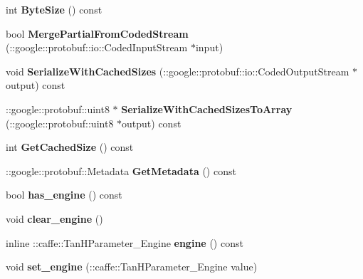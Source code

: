 \begin{DoxyCompactItemize}
int {\bfseries Byte\+Size} () const
\item 
\mbox{\label{classcaffe_1_1_tan_h_parameter_afb75bf9760a1dcd7747487f42086c86d}} 
bool {\bfseries Merge\+Partial\+From\+Coded\+Stream} (\+::google\+::protobuf\+::io\+::\+Coded\+Input\+Stream $\ast$input)
\item 
\mbox{\label{classcaffe_1_1_tan_h_parameter_a77dd8db88f6d8cfd109ab6d1f748c26b}} 
void {\bfseries Serialize\+With\+Cached\+Sizes} (\+::google\+::protobuf\+::io\+::\+Coded\+Output\+Stream $\ast$output) const
\item 
\mbox{\label{classcaffe_1_1_tan_h_parameter_a334aa4adb109649f92eabee68ee9a85c}} 
\+::google\+::protobuf\+::uint8 $\ast$ {\bfseries Serialize\+With\+Cached\+Sizes\+To\+Array} (\+::google\+::protobuf\+::uint8 $\ast$output) const
\item 
\mbox{\label{classcaffe_1_1_tan_h_parameter_a8c4cec5ba8a1e20875c0ab0c1ab48e09}} 
int {\bfseries Get\+Cached\+Size} () const
\item 
\mbox{\label{classcaffe_1_1_tan_h_parameter_a49192e66d09c15f7d65b7f2bc22eecca}} 
\+::google\+::protobuf\+::\+Metadata {\bfseries Get\+Metadata} () const
\item 
\mbox{\label{classcaffe_1_1_tan_h_parameter_ad18036973ee7721d90dd80f4fe047714}} 
bool {\bfseries has\+\_\+engine} () const
\item 
\mbox{\label{classcaffe_1_1_tan_h_parameter_a67458ee62377a7a8fb4e100da5e6da2b}} 
void {\bfseries clear\+\_\+engine} ()
\item 
\mbox{\label{classcaffe_1_1_tan_h_parameter_a76583a779e92a30fd6d031ad7b8641f7}} 
inline \+::caffe\+::\+Tan\+H\+Parameter\+\_\+\+Engine {\bfseries engine} () const
\item 
\mbox{\label{classcaffe_1_1_tan_h_parameter_ab068dcb706690a41483c7b6632cd4db4}} 
void {\bfseries set\+\_\+engine} (\+::caffe\+::\+Tan\+H\+Parameter\+\_\+\+Engine value)
\end{DoxyCompactItemize}

